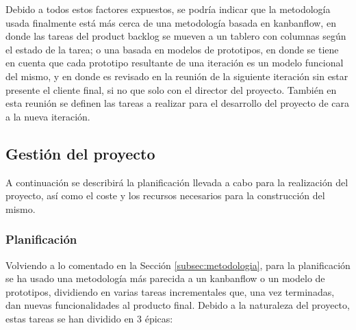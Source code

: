 Debido a todos estos factores expuestos, se podría indicar que la metodología usada finalmente está más cerca de una metodología basada en kanbanflow, en donde las tareas del product backlog se mueven a un tablero con columnas según el estado de la tarea; o una basada en modelos de prototipos, en donde se tiene en cuenta que cada prototipo resultante de una iteración es un modelo funcional del mismo, y en donde es revisado en la reunión de la siguiente iteración sin estar presente el cliente final, si no que solo con el director del proyecto. También en esta reunión se definen las tareas a realizar para el desarrollo del proyecto de cara a la nueva iteración.

\subsection{Gestión del proyecto}
\label{subsec:gestion}

A continuación se describirá la planificación llevada a cabo para la realización del proyecto, así como el coste y los recursos necesarios para la construcción del mismo.

\subsubsection{Planificación}

Volviendo a lo comentado en la Sección \ref{subsec:metodologia}, para la planificación se ha usado una metodología más parecida a un kanbanflow o un modelo de prototipos, dividiendo en varias tareas incrementales que, una vez terminadas, dan nuevas funcionalidades al producto final. Debido a la naturaleza del proyecto, estas tareas se han dividido en 3 épicas:


